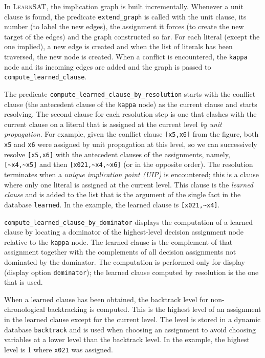 \documentclass[11pt]{article}
\newcommand*{\p}[1]{\textup{\texttt{#1}}}
\newcommand*{\ls}{\textsc{LearnSAT}}
\begin{document}
In \ls{}, the implication graph is built incrementally. Whenever a unit
clause is found, the predicate \p{extend\_graph} is called with the unit
clause, its number (to label the new edges), the assignment it forces
(to create the new target of the edges) and the graph constructed so
far. For each literal (except the one implied), a new edge is created
and when the list of literals has been traversed, the new node is
created. When a conflict is encountered, the \p{kappa} node and its
incoming edges are added and the graph is passed to
\p{compute\_learned\_clause}.

The predicate \p{compute\_learned\_clause\_by\_resolution} starts with
the conflict clause (the antecedent clause of the \p{kappa} node) as the
current clause and starts resolving. The second clause for each
resolution step is one that clashes with the current clause on a literal
that is assigned at the current level \emph{by unit propagation}. For
example, given the conflict clause \p{[x5,x6]} from the figure, both
\p{x5} and \p{x6} were assigned by unit propagation at this level, so we
can successively resolve \p{[x5,x6]} with the antecedent clauses of the
assignments, namely, \verb+[~x4,~x5]+ and then \verb+[x021,~x4,~x6]+ (or
in the opposite order). The resolution terminates when a \emph{unique
implication point (UIP)} is encountered; this is a clause where only one
literal is assigned at the current level. This clause is the
\emph{learned clause} and is added to the list that is the argument of
the single fact in the database \p{learned}. In the example, the learned
clause is \verb+[x021,~x4]+.

\p{compute\_learned\_clause\_by\_dominator} displays the computation of
a learned clause by locating a dominator of the highest-level decision
assignment node relative to the \p{kappa} node. The learned clause is
the complement of that assignment together with the complements of all
decision assignments not dominated by the dominator. The computation is
performed only for display (display option \p{dominator}); the learned
clause computed by resolution is the one that is used.

When a learned clause has been obtained, the backtrack level for
non-chronological backtracking is computed. This is the highest level of
an assignment in the learned clause except for the current level. The
level is stored in a dynamic database \p{backtrack} and is used when
choosing an assignment to avoid choosing variables at a lower level than
the backtrack level. In the example, the highest level is 1 where
\p{x021} was assigned.
\end{document}
